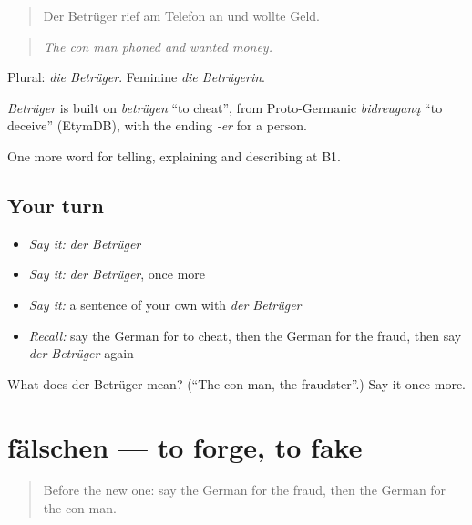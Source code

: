 \begin{quote}
Der Betrüger rief am Telefon an und wollte Geld.
\end{quote}

\begin{quote}
\emph{The con man phoned and wanted money.}
\end{quote}

Plural: \emph{die Betrüger}. Feminine \emph{die Betrügerin}.

\begin{cousinweb}
\emph{Betrüger} is built on \emph{betrügen} \textquotedblleft{}to cheat\textquotedblright{}, from Proto-Germanic \emph{bidreuganą} \textquotedblleft{}to deceive\textquotedblright{} (EtymDB), with the ending \emph{-er} for a person.
\end{cousinweb}

\begin{grammarlens}[title={What you've built}]
One more word for telling, explaining and describing at B1.
\end{grammarlens}

\subsection*{Your turn}
\begin{itemize}
\raggedright
  \item \emph{Say it:} \emph{der Betrüger}
  \item \emph{Say it:} \emph{der Betrüger}, once more
  \item \emph{Say it:} a sentence of your own with \emph{der Betrüger}
  \item \emph{Recall:} say the German for to cheat, then the German for the fraud, then say \emph{der Betrüger} again
\end{itemize}

\begin{tcolorbox}[breakable,colback=teal!4,colframe=teal!35!black,title={Before you move on}]
What does der Betrüger mean? (\textquotedblleft{}The con man, the fraudster\textquotedblright{}.) Say it once more.
\end{tcolorbox}
\section[fälschen]{fälschen — to forge, to fake}

\label{lesson:GE-C285-faelschen}



\begin{quote}
Before the new one: say the German for the fraud, then the German for the con man.
\end{quote}

